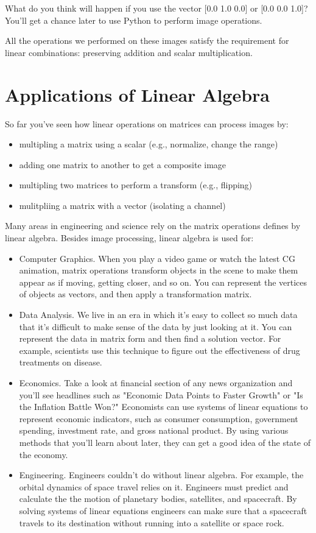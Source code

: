 What do you think will happen if you use the vector [0.0 1.0 0.0] or 
[0.0 0.0 1.0]? You'll get a chance later to use Python to perform image 
operations.

All the operations we performed on these images satisfy the requirement for 
linear combinations: preserving addition and scalar multiplication. 


\section{Applications of Linear Algebra}

So far you've seen how linear operations on matrices can process images by:
\begin{itemize}
\item multipling a matrix using a scalar (e.g., normalize, change the range)
\item adding one matrix to another to get a composite image 
\item multipling two matrices to perform a transform (e.g., flipping)
\item mulitpliing a matrix with a vector (isolating a channel)
\end{itemize}

Many areas in engineering and science rely on the matrix operations defines by 
linear algebra. Besides image processing, linear algebra is used for: 
\begin{itemize}
\item Computer Graphics. When you play a video game or watch the latest CG 
animation, matrix operations transform objects in the scene to make them appear 
as if moving, getting closer, and so on. You can represent the vertices of 
objects as vectors, and then apply a transformation matrix.
\item Data Analysis. We live in an era in which it's easy to collect so much 
data that it's difficult to make sense of the data by just looking at it. You 
can represent the data in matrix form and then find a solution vector. For 
example, scientists use this technique to figure out the effectiveness of drug 
treatments on disease.
\item Economics. Take a look at financial section of any news organization and 
you'll see headlines such as "Economic Data Points to Faster Growth" or "Is 
the Inflation Battle Won?" Economists can use systems of linear equations to 
represent economic indicators, such as consumer consumption, government 
spending, investment rate, and gross national product. By using various methods 
that you'll learn about later, they can get a good idea of the state of the 
economy.
\item Engineering. Engineers couldn't do without linear algebra. For example, 
the orbital dynamics of space travel relies on it. Engineers must predict and 
calculate the the motion of planetary bodies, satellites, and spacecraft. By 
solving systems of linear equations engineers can make sure that a spacecraft 
travels to its destination without running into a satellite or space rock.
\end{itemize}

